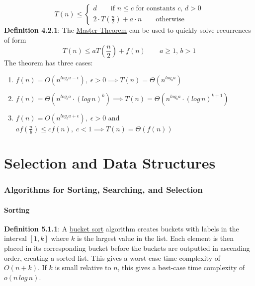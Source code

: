 \documentclass{article}
\newcommand{\definition}[2]{\textbf{Definition #1}: #2\label{def:#1}}
\begin{document}
\begin{equation}
    T(n) \leq 
    \begin{cases}
        d   \qquad \text{if } n \leq c \text{ for constants } c,\,d > 0 \\
        2 \cdot T(\frac{n}{2}) + a \cdot n  \qquad \text{otherwise}
    \end{cases}
\end{equation}
\definition{4.2.1}{The \underline{Master Theorem} can be used to quickly solve recurrences of form}
\begin{equation}
    T(n) \leq a T\left(\frac{n}{2}\right) + f(n) \quad\quad a \geq 1, \, b > 1
\end{equation}
The theorem has three cases:
\begin{enumerate}
    \item \(f(n) = O(n^{log_b a - \epsilon}), \; \epsilon > 0 \implies T(n) = \Theta(n^{log_b a})\)
    \item \(f(n) = \Theta(n^{log_b a} \cdot (log \, n)^k) \implies T(n) = \Theta(n^{log_b a} \cdot (log \, n)^{k+1})\)
    \item \(f(n) = O(n^{log_b a + \epsilon}), \; \epsilon > 0\) and \(a f(\frac{n}{b}) \leq c f(n), \; c < 1 \implies T(n) = \Theta(f(n))\)
\end{enumerate}

\newpage\part{Selection and Data Structures}\label{part:3.sds}

\section{Algorithms for Sorting, Searching, and Selection}

\subsection{Sorting}

\definition{5.1.1}{A \underline{bucket sort} algorithm creates buckets with labels in the interval \([1,k]\) where \(k\) is the largest value in the list. Each element is then placed in its corresponding bucket before the buckets are outputted in ascending order, creating a sorted list.}
This gives a worst-case time complexity of \(O(n+k)\). If \(k\) is small relative to \(n\), this gives a best-case time complexity of \(o(n \, log \, n)\). 
\end{document}
